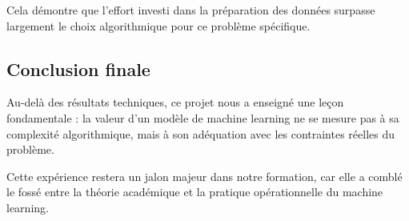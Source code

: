 \documentclass[11pt]{article}
\begin{document}
Cela démontre que l'effort investi dans la préparation des données
surpasse largement le choix algorithmique pour ce problème spécifique.

\subsection{Conclusion finale}\label{conclusion-finale}

Au-delà des résultats techniques, ce projet nous a enseigné une leçon
fondamentale : la valeur d'un modèle de machine learning ne se mesure
pas à sa complexité algorithmique, mais à son adéquation avec les
contraintes réelles du problème.

Cette expérience restera un jalon majeur dans notre formation, car elle
a comblé le fossé entre la théorie académique et la pratique
opérationnelle du machine learning.


\end{document}
